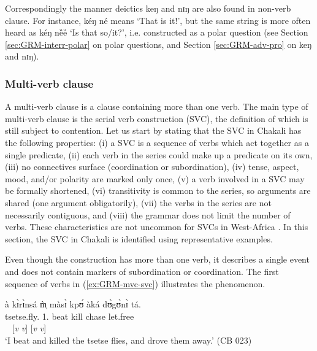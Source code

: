 Correspondingly the manner deictics {\sls keŋ} and {\sls  nɪŋ} are also found 
in 
non-verb
clause. For instance, {\sls kéŋ né} means `That is it!', but the same string 
is
more often heard as {\sls kéŋ nȅȅ} `Is that so/it?',  i.e.
constructed  as a polar question (see Section \ref{sec:GRM-interr-polar} on 
polar questions, and Section \ref{sec:GRM-adv-pro}  on  {\sls keŋ} 
and
{\sls  nɪŋ}).



\subsubsection{Multi-verb clause}
\label{sec:GRM-multi-verb-clause}



A multi-verb clause is a clause containing more than one verb. The main type of
multi-verb clause is the serial verb construction (SVC), the definition of which
is still subject to contention. Let us start by stating that the SVC in Chakali
has the following properties: (i) a SVC is a sequence of verbs which act
together as a single predicate, (ii) each verb in the series could make up a
predicate on its own, (iii)  no connectives  surface (coordination or
subordination), (iv)  tense, aspect, mood, and/or polarity are marked only once,
(v)  a verb involved in a SVC may be formally shortened,  (vi)  transitivity is
common to the series, so arguments are shared (one argument obligatorily), (vii)
the verbs in the series are not necessarily contiguous, and  (viii) the grammar
does not limit the number of verbs. These characteristics are not uncommon for 
SVCs in West-Africa \citep{Amek05a}. In this section, the SVC in Chakali is
identified using representative examples. 


Even though the construction has more than one
verb, it describes a single event and does not contain  markers of
subordination or coordination. The first sequence of verbs in
(\ref{ex:GRM-mvc-svc}) illustrates the phenomenon.



\ea\label{ex:GRM-mvc-svc}
\glll à  kɪ̀rɪ̀nsá   m̩̀   màsɪ̀   kpʊ́ àká dʊ̀gʊ̀nɪ̀ tá.\\
{\art}  tsetse.fly.{\pl}   {1.\sg}    beat   kill   {\conn} 
chase   let.free\\
 {} {} {}  {} [{\it v} {\it v}]  {} [{\it v} {\it v}]\\
\glt `I beat and killed the tsetse flies, and drove them away.' (CB 023)
\z

